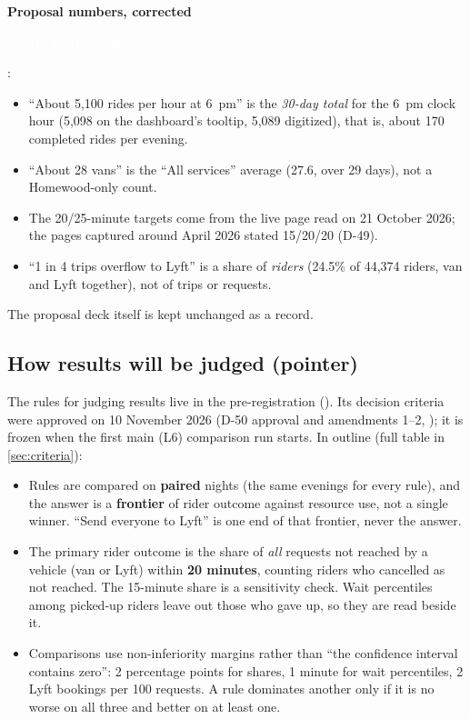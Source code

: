 \documentclass[11pt,letterpaper]{article}
\newcommand{\marker}[2]{{\setlength{\fboxsep}{1.4pt}\colorbox{#1}{\textcolor{white}{\sffamily\bfseries\scriptsize\strut #2}}}}
\newcommand{\Evidence}{\marker{cEvid}{APRIL EVIDENCE}}
\newcommand{\status}[2]{{\setlength{\fboxsep}{1.1pt}\fcolorbox{#1}{white}{\textcolor{#1}{\sffamily\scriptsize\strut #2}}}}
\newcommand{\Accepted}{\status{cAccepted}{accepted}}
\DeclareRobustCommand{\fn}[1]{\texttt{\detokenize{#1}}}
\newcommand{\D}[1]{D-#1}
\begin{document}
\textbf{Proposal numbers, corrected} \Evidence:
\begin{itemize}
\item ``About 5,100 rides per hour at 6~pm'' is the \emph{30-day total} for the 6~pm clock hour (5,098 on the dashboard's tooltip, 5,089 digitized), that is, about 170 completed rides per evening.
\item ``About 28 vans'' is the ``All services'' average (27.6, over 29 days), not a Homewood-only count.
\item The 20/25-minute targets come from the live page read on 21 October 2026; the pages captured around April 2026 stated 15/20/20 (\D{49}).
\item ``1 in 4 trips overflow to Lyft'' is a share of \emph{riders} (24.5\% of 44,374 riders, van and Lyft together), not of trips or requests.
\end{itemize}
The proposal deck itself is kept unchanged as a record.

\subsection{How results will be judged (pointer)}
The rules for judging results live in the pre-registration (\fn{preregistration_v2.md}). Its decision criteria were approved on 10 November 2026 (\D{50} approval and amendments 1--2, \Accepted); it is frozen when the first main (L6) comparison run starts. In outline (full table in \cref{sec:criteria}):
\begin{itemize}
\item Rules are compared on \textbf{paired} nights (the same evenings for every rule), and the answer is a \textbf{frontier} of rider outcome against resource use, not a single winner. ``Send everyone to Lyft'' is one end of that frontier, never the answer.
\item The primary rider outcome is the share of \emph{all} requests not reached by a vehicle (van or Lyft) within \textbf{20 minutes}, counting riders who cancelled as not reached. The 15-minute share is a sensitivity check. Wait percentiles among picked-up riders leave out those who gave up, so they are read beside it.
\item Comparisons use non-inferiority margins rather than ``the confidence interval contains zero'': 2 percentage points for shares, 1 minute for wait percentiles, 2 Lyft bookings per 100 requests. A rule dominates another only if it is no worse on all three and better on at least one.
\end{itemize}
\end{document}

